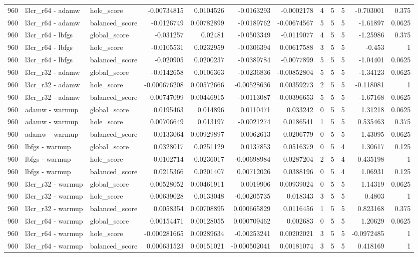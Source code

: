 \begin{tabular}{rllrrrrrrrrr}
960 & l3cr_r64 - adamw & hole_score & -0.00734815 & 0.0104526 & -0.0163293 & -0.0002178 & 4 & 5 & 5 & -0.703001 & 0.375 \\
960 & l3cr_r64 - adamw & balanced_score & -0.0126749 & 0.00782899 & -0.0189762 & -0.00674567 & 5 & 5 & 5 & -1.61897 & 0.0625 \\
960 & l3cr_r64 - lbfgs & global_score & -0.031257 & 0.02481 & -0.0503349 & -0.0119077 & 4 & 5 & 5 & -1.25986 & 0.375 \\
960 & l3cr_r64 - lbfgs & hole_score & -0.0105531 & 0.0232959 & -0.0306394 & 0.00617588 & 3 & 5 & 5 & -0.453 & 1 \\
960 & l3cr_r64 - lbfgs & balanced_score & -0.020905 & 0.0200237 & -0.0389784 & -0.0077899 & 5 & 5 & 5 & -1.04401 & 0.0625 \\
960 & l3cr_r32 - adamw & global_score & -0.0142658 & 0.0106363 & -0.0236836 & -0.00852804 & 5 & 5 & 5 & -1.34123 & 0.0625 \\
960 & l3cr_r32 - adamw & hole_score & -0.000676208 & 0.00572666 & -0.00528636 & 0.00359273 & 2 & 5 & 5 & -0.118081 & 1 \\
960 & l3cr_r32 - adamw & balanced_score & -0.00747099 & 0.00446915 & -0.0113087 & -0.00396653 & 5 & 5 & 5 & -1.67168 & 0.0625 \\
960 & adamw - warmup & global_score & 0.0195463 & 0.014896 & 0.0110471 & 0.033242 & 0 & 5 & 5 & 1.31218 & 0.0625 \\
960 & adamw - warmup & hole_score & 0.00706649 & 0.013197 & -0.0021274 & 0.0186541 & 1 & 5 & 5 & 0.535463 & 0.375 \\
960 & adamw - warmup & balanced_score & 0.0133064 & 0.00929897 & 0.0062613 & 0.0206779 & 0 & 5 & 5 & 1.43095 & 0.0625 \\
960 & lbfgs - warmup & global_score & 0.0328017 & 0.0251129 & 0.0137853 & 0.0516379 & 0 & 5 & 4 & 1.30617 & 0.125 \\
960 & lbfgs - warmup & hole_score & 0.0102714 & 0.0236017 & -0.00698984 & 0.0287204 & 2 & 5 & 4 & 0.435198 & 1 \\
960 & lbfgs - warmup & balanced_score & 0.0215366 & 0.0201407 & 0.00712026 & 0.0388196 & 0 & 5 & 4 & 1.06931 & 0.125 \\
960 & l3cr_r32 - warmup & global_score & 0.00528052 & 0.00461911 & 0.0019906 & 0.00939024 & 0 & 5 & 5 & 1.14319 & 0.0625 \\
960 & l3cr_r32 - warmup & hole_score & 0.00639028 & 0.0133048 & -0.00205735 & 0.018343 & 3 & 5 & 5 & 0.4803 & 1 \\
960 & l3cr_r32 - warmup & balanced_score & 0.0058354 & 0.00708895 & 0.000665829 & 0.0116456 & 1 & 5 & 5 & 0.823168 & 0.375 \\
960 & l3cr_r64 - warmup & global_score & 0.00154471 & 0.00128055 & 0.000709462 & 0.002683 & 0 & 5 & 5 & 1.20629 & 0.0625 \\
960 & l3cr_r64 - warmup & hole_score & -0.000281665 & 0.00289634 & -0.00253241 & 0.00202021 & 3 & 5 & 5 & -0.0972485 & 1 \\
960 & l3cr_r64 - warmup & balanced_score & 0.000631523 & 0.00151021 & -0.000502041 & 0.00181074 & 3 & 5 & 5 & 0.418169 & 1 \\
\bottomrule
\end{tabular}
